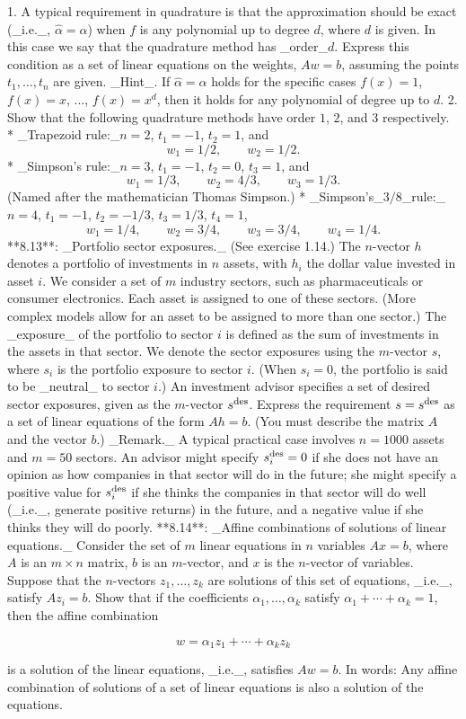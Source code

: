1. A typical requirement in quadrature is that the approximation should be exact (_i.e._, \(\hat{\alpha}=\alpha\)) when \(f\) is any polynomial up to degree \(d\), where \(d\) is given. In this case we say that the quadrature method has _order_\(d\). Express this condition as a set of linear equations on the weights, \(Aw=b\), assuming the points \(t_{1},\ldots,t_{n}\) are given. _Hint_. If \(\hat{\alpha}=\alpha\) holds for the specific cases \(f(x)=1\), \(f(x)=x\), ..., \(f(x)=x^{d}\), then it holds for any polynomial of degree up to \(d\).
2. Show that the following quadrature methods have order \(1\), \(2\), and \(3\) respectively. * _Trapezoid rule:_\(n=2\), \(t_{1}=-1\), \(t_{2}=1\), and \[w_{1}=1/2,\qquad w_{2}=1/2.\] * _Simpson's rule:_\(n=3\), \(t_{1}=-1\), \(t_{2}=0\), \(t_{3}=1\), and \[w_{1}=1/3,\qquad w_{2}=4/3,\qquad w_{3}=1/3.\] (Named after the mathematician Thomas Simpson.) * _Simpson's_\(3/8\)_rule:_\(n=4\), \(t_{1}=-1\), \(t_{2}=-1/3\), \(t_{3}=1/3\), \(t_{4}=1\), \[w_{1}=1/4,\qquad w_{2}=3/4,\qquad w_{3}=3/4,\qquad w_{4}=1/4.\]
**8.13**: _Portfolio sector exposures._ (See exercise 1.14.) The \(n\)-vector \(h\) denotes a portfolio of investments in \(n\) assets, with \(h_{i}\) the dollar value invested in asset \(i\). We consider a set of \(m\) industry sectors, such as pharmaceuticals or consumer electronics. Each asset is assigned to one of these sectors. (More complex models allow for an asset to be assigned to more than one sector.) The _exposure_ of the portfolio to sector \(i\) is defined as the sum of investments in the assets in that sector. We denote the sector exposures using the \(m\)-vector \(s\), where \(s_{i}\) is the portfolio exposure to sector \(i\). (When \(s_{i}=0\), the portfolio is said to be _neutral_ to sector \(i\).) An investment advisor specifies a set of desired sector exposures, given as the \(m\)-vector \(s^{\rm des}\). Express the requirement \(s=s^{\rm des}\) as a set of linear equations of the form \(Ah=b\). (You must describe the matrix \(A\) and the vector \(b\).) _Remark._ A typical practical case involves \(n=1000\) assets and \(m=50\) sectors. An advisor might specify \(s_{i}^{\rm des}=0\) if she does not have an opinion as how companies in that sector will do in the future; she might specify a positive value for \(s_{i}^{\rm des}\) if she thinks the companies in that sector will do well (_i.e._, generate positive returns) in the future, and a negative value if she thinks they will do poorly.
**8.14**: _Affine combinations of solutions of linear equations._ Consider the set of \(m\) linear equations in \(n\) variables \(Ax=b\), where \(A\) is an \(m\times n\) matrix, \(b\) is an \(m\)-vector, and \(x\) is the \(n\)-vector of variables. Suppose that the \(n\)-vectors \(z_{1},\ldots,z_{k}\) are solutions of this set of equations, _i.e._, satisfy \(Az_{i}=b\). Show that if the coefficients \(\alpha_{1},\ldots,\alpha_{k}\) satisfy \(\alpha_{1}+\cdots+\alpha_{k}=1\), then the affine combination

\[w=\alpha_{1}z_{1}+\cdots+\alpha_{k}z_{k}\]

is a solution of the linear equations, _i.e._, satisfies \(Aw=b\). In words: Any affine combination of solutions of a set of linear equations is also a solution of the equations.

